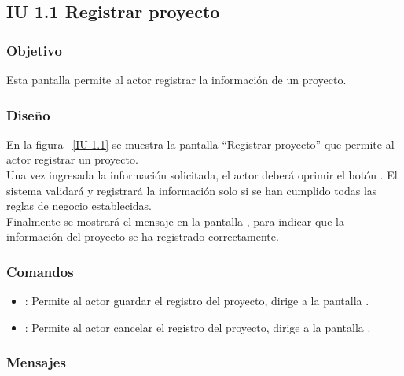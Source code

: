 \newpage 
\subsection{IU 1.1 Registrar proyecto}

\subsubsection{Objetivo}
	
    Esta pantalla permite al actor registrar la información de un proyecto.

\subsubsection{Diseño}

    En la figura ~\ref{IU 1.1} se muestra la pantalla ``Registrar proyecto'' que permite al actor registrar un proyecto. \\
    
    Una vez ingresada la información solicitada, el actor deberá oprimir el botón . El sistema validará y registrará la 
    información solo si se han cumplido todas las reglas de negocio establecidas.  \\
    
    Finalmente se mostrará el mensaje  en la pantalla , 
    para indicar que la información del proyecto
    se ha registrado correctamente.        



\subsubsection{Comandos}
\begin{itemize}
	\item {}: Permite al actor guardar el registro del proyecto, dirige a la pantalla .
	\item {}: Permite al actor cancelar el registro del proyecto, dirige a la pantalla .
\end{itemize}

\subsubsection{Mensajes}
	
